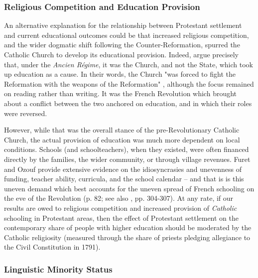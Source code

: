 \documentclass[12pt]{article}
\begin{document}
\subsubsection{Religious Competition and Education Provision}

An alternative explanation for the relationship between Protestant settlement and current educational outcomes could be that increased religious competition, and the wider dogmatic shift following the Counter-Reformation, spurred the Catholic Church to develop its educational provision.  Indeed, \textcite{furetReadingWritingLiteracy1983, furetThreeCenturies} argue precisely that, under the \textit{Ancien Régime}, it was the Church, and not the State, which took up education as a cause. In their words, the Church "was forced to fight the Reformation with the weapons of the Reformation" \parencite[p. 60]{furetReadingWritingLiteracy1983}, although the focus remained on reading rather than writing. It was the French Revolution which brought about a conflict between the two anchored on education, and in which their roles were reversed. 

However, while that was the overall stance of the pre-Revolutionary Catholic Church, the actual provision of education was much more dependent on local conditions. Schools (and schoolteachers), when they existed, were often financed directly by the families, the wider community, or through village revenues. Furet and Ozouf provide extensive evidence on the idiosyncrasies and unevenness of funding, teacher ability, curricula, and the school calendar -- and that is is this uneven demand which best accounts for the uneven spread of French schooling on the eve of the Revolution (p. 82; see also \cite{weberPeasantsFrenchmenModernization1976a}, pp. 304-307). At any rate, if our results are owed to religious competition and increased provision of \textit{Catholic} schooling in Protestant areas, then the effect of Protestant settlement on the contemporary share of people with higher education should be moderated by the Catholic religiosity (measured through the share of priests pledging allegiance to the Civil Constitution in 1791).

\subsubsection{Linguistic Minority Status}
\end{document}
